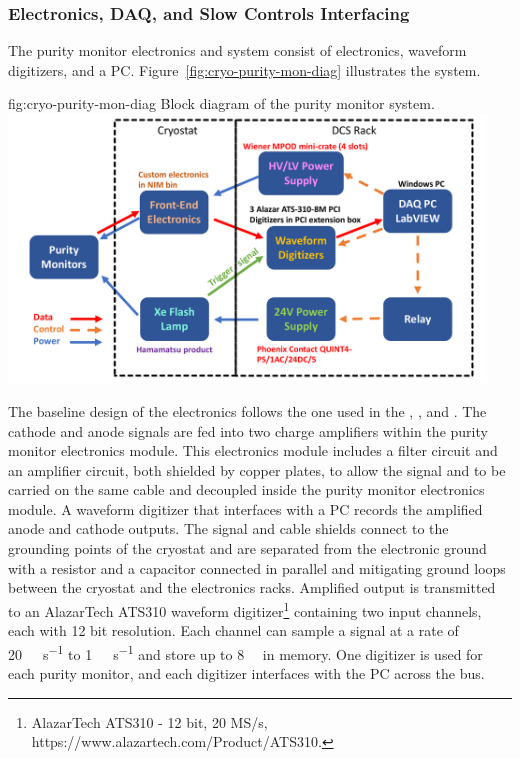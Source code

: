 \subsubsection{Electronics, DAQ, and Slow Controls Interfacing}
The purity monitor electronics and  system consist of  electronics, waveform digitizers, and a  PC.  Figure~\ref{fig:cryo-purity-mon-diag} %
illustrates the system.

\begin{dunefigure}{fig:cryo-purity-mon-diag}
  {Block diagram of the purity monitor system.}
  \includegraphics[width=0.95\textwidth]{graphics/PrMon_BlockDiagram_v2.pdf}
\end{dunefigure}


The baseline design of the  electronics follows the one used in %
the , , 
and \microboone. The cathode and anode signals are fed into two charge amplifiers within the purity monitor electronics module.
This electronics module includes a  filter circuit and an amplifier circuit, both shielded by copper plates, to allow the signal and  to be carried on the same cable and decoupled inside the purity monitor electronics module. 
A waveform digitizer that interfaces with a  PC records the amplified anode and cathode outputs. 
The signal and  cable shields connect to the grounding points of the cryostat and are separated from the electronic ground with a resistor and a capacitor connected in parallel and mitigating ground loops between the cryostat and the electronics racks. Amplified output is transmitted to an AlazarTech ATS310 waveform digitizer\footnote{AlazarTech ATS310\texttrademark{} - 12 bit, 20 MS/s,  https://www.alazartech.com/Product/ATS310.} containing two input channels, each with 12 bit resolution. Each channel can sample a signal at a rate of \SI{20}{\mega\samples\per\second} to \SI{1}{\kilo\samples\per\second} and store up to \SI{8}{\mega\samples} in memory. One digitizer is used for each purity monitor, and each digitizer interfaces with the  PC across the  bus. 


